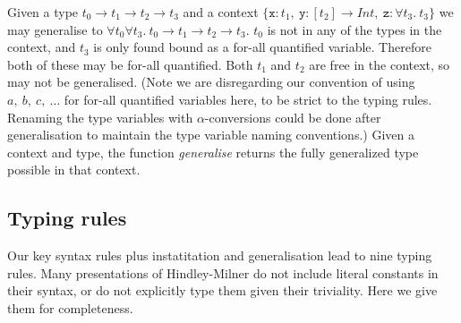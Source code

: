 \documentclass[a4paper,fleqn,oneside,12pt]{report}
\begin{document}
Given a type $t_0 \rightarrow t_1 \rightarrow t_2 \rightarrow t_3$ and a context $\{ \mathtt{x} : t_1,\ \mathtt{y} : [t_2] \rightarrow Int,\ \mathtt{z} : \forall t_3.\ t_3 \}$ we may generalise to $\forall t_0 \forall t_3.\ t_0 \rightarrow t_1 \rightarrow t_2 \rightarrow t_3$. $t_0$ is not in any of the types in the context, and $t_3$ is only found bound as a for-all quantified variable. Therefore both of these may be for-all quantified. Both $t_1$ and $t_2$ are free in the context, so may not be generalised. (Note we are disregarding our convention of using $a,\ b,\ c,\ \dots$ for for-all quantified variables here, to be strict to the typing rules. Renaming the type variables with $\alpha$-conversions could be done after generalisation to maintain the type variable naming conventions.) Given a context and type, the function \textit{generalise} returns the fully generalized type possible in that context.

\subsection{Typing rules}

Our key syntax rules plus instatitation and generalisation lead to nine typing rules. Many presentations of Hindley-Milner do not include literal constants in their syntax, or do not explicitly type them given their triviality. Here we give them for completeness.
\end{document}
